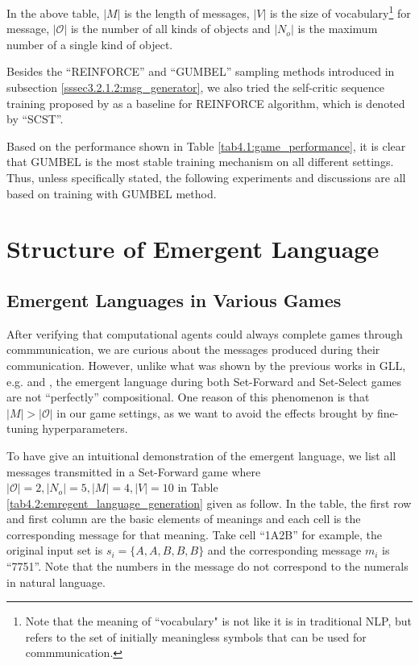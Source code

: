 In the above table, $|M|$ is the length of messages, $|V|$ is the size of vocabulary\footnote{Note that the meaning of ``vocabulary" is not like it is in traditional NLP, but refers to the set of initially meaningless symbols that can be used for commmunication.} for message, $|\mathcal{O}|$ is the number of all kinds of objects and $|N_o|$ is the maximum number of a single kind of object.

Besides the ``REINFORCE'' and ``GUMBEL'' sampling methods introduced in subsection \ref{sssec3.2.1.2:msg_generator}, we also tried the self-critic sequence training proposed by \cite{rennie2017self} as a baseline for REINFORCE algorithm, which is denoted by ``SCST''.

Based on the performance shown in Table \ref{tab4.1:game_performance}, it is clear that GUMBEL is the most stable training mechanism on all different settings. Thus, unless specifically stated, the following experiments and discussions are all based on training with GUMBEL method.


\section{Structure of Emergent Language}
\label{sec4.2:structure_emergent_lan}

\subsection{Emergent Languages in Various Games}
\label{ssec4.2.1:emergent_languages}

After verifying that computational agents could always complete games through commmunication, we are curious about the messages produced during their communication. However, unlike what was shown by the previous works in GLL, e.g. \cite{hill2017understanding} and \cite{mordatch2018emergence}, the emergent language during both Set-Forward and Set-Select games are not ``perfectly'' compositional. One reason of this phenomenon is that $|M| > |\mathcal{O}|$ in our game settings, as we want to avoid the effects brought by fine-tuning hyperparameters.

To have give an intuitional demonstration of the emergent language, we list all messages transmitted in a Set-Forward game where $|\mathcal{O}|=2, |N_o|=5, |M|=4, |V|=10$ in Table \ref{tab4.2:emregent_language_generation} given as follow. In the table, the first row and first column are the basic elements of meanings and each cell is the corresponding message for that meaning. Take cell ``1A2B'' for example, the original input set is $s_i=\{A,A,B,B,B\}$ and the corresponding message $m_i$ is ``7751''. Note that the numbers in the message do not correspond to the numerals in natural language.

